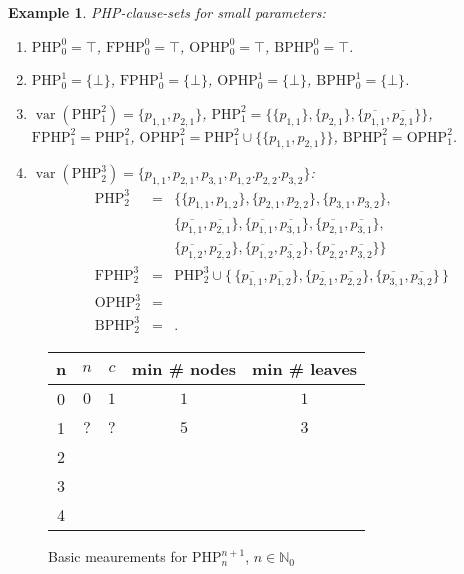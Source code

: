 \documentclass{report}
\newtheorem{examp}[defi]{Example}
\newcommand{\set}[1]{\{ #1 \}}
\newcommand{\setb}[1]{\big \{ \, #1 \, \big \}}
\newcommand{\ol}{\overline}
\newcommand{\NN}{\mathbb{N}}
\newcommand{\NNZ}{\NN_0}
\DeclareMathOperator{\var}{var}
\newcommand{\php}{\mathrm{PHP}}
\newcommand{\fphp}{\mathrm{FPHP}} %
\newcommand{\ophp}{\mathrm{OPHP}} %
\newcommand{\ofphp}{\mathrm{BPHP}} %
\begin{document}
\begin{examp}\label{exp:PHPdef}
  PHP-clause-sets for small parameters:
  \begin{enumerate}
  \item $\php^0_0 = \top$, $\fphp^0_0 = \top$, $\ophp^0_0 = \top$, $\ofphp^0_0 = \top$.
  \item $\php^1_0 = \set{\bot}$, $\fphp^1_0 = \set{\bot}$, $\ophp^1_0 = \set{\bot}$, $\ofphp^1_0 = \set{\bot}$.
  \item $\var(\php^2_1) = \set{p_{1,1},p_{2,1}}$, $\php^2_1 = \set{\set{p_{1,1}}, \set{p_{2,1}}, \set{\ol{p_{1,1}},\ol{p_{2,1}}}}$, $\fphp^2_1 = \php^2_1$, $\ophp^2_1 = \php^2_1 \cup \set{\set{p_{1,1},p_{2,1}}}$, $\ofphp^2_1 = \ophp^2_1$.
  \item $\var(\php^3_2) = \set{p_{1,1},p_{2,1}, p_{3,1},p_{1,2}.p_{2,2}.p_{3,2}}$:
    \begin{eqnarray*}
      \php^3_2 & = & \set{\set{p_{1,1},p_{1,2}},\set{p_{2,1},p_{2,2}},\set{p_{3,1},p_{3,2}},
      \\
      && \set{\ol{p_{1,1}},\ol{p_{2,1}}},\set{\ol{p_{1,1}},\ol{p_{3,1}}},\set{\ol{p_{2,1}},\ol{p_{3,1}}},
      \\
      && \set{\ol{p_{1,2}},\ol{p_{2,2}}},\set{\ol{p_{1,2}},\ol{p_{3,2}}},\set{\ol{p_{2,2}},\ol{p_{3,2}}} }\\
    \fphp^3_2 & = & \php^3_2 \cup \setb{ \set{\ol{p_{1,1}},\ol{p_{1,2}}},\set{\ol{p_{2,1}},\ol{p_{2,2}}},\set{\ol{p_{3,1}},\ol{p_{3,2}}} }
\\
      \ophp^3_2 & = &\\
      \ofphp^3_2 & = &.
    \end{eqnarray*}
  \end{enumerate}
\end{examp}

\begin{figure}[h]
  \centering
  \begin{tabular}{c|c|c|c|c}
    \hline
    n & $n$ &  $c$ & min \# nodes & min \# leaves \\ \hline
    0 & $0$ & $1$ & $1$ & $1$\\ \hline
    1 & $?$ & $?$ & $5$ & $3$    \\ \hline
    2 &                 &        \\ \hline
    3 &                 &        \\ \hline
    4 &                 &        \\ \hline
    \end{tabular}
  \caption{Basic meaurements for $\php^{n+1}_n$, $n \in \NNZ$}
  \label{fig:basicmeasurement}
\end{figure}
\end{document}
